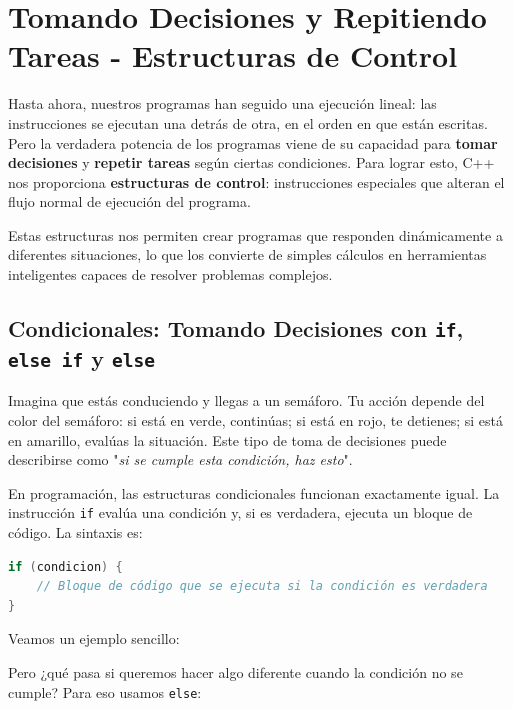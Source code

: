 \section{Tomando Decisiones y Repitiendo Tareas - Estructuras de Control}\label{sec:estructuras_control}

Hasta ahora, nuestros programas han seguido una ejecución lineal: las instrucciones se ejecutan una detrás de otra, en el orden en que están escritas. Pero la verdadera potencia de los programas viene de su capacidad para \textbf{tomar decisiones} y \textbf{repetir tareas} según ciertas condiciones. Para lograr esto, C++ nos proporciona \textbf{estructuras de control}: instrucciones especiales que alteran el flujo normal de ejecución del programa.

Estas estructuras nos permiten crear programas que responden dinámicamente a diferentes situaciones, lo que los convierte de simples cálculos en herramientas inteligentes capaces de resolver problemas complejos.

\subsection{Condicionales: Tomando Decisiones con \texttt{if}, \texttt{else if} y \texttt{else}}\label{subsec:condicionales}

Imagina que estás conduciendo y llegas a un semáforo. Tu acción depende del color del semáforo: si está en verde, continúas; si está en rojo, te detienes; si está en amarillo, evalúas la situación. Este tipo de toma de decisiones puede describirse como "\textit{si se cumple esta condición, haz esto}".

En programación, las estructuras condicionales funcionan exactamente igual. La instrucción \texttt{if} evalúa una condición y, si es verdadera, ejecuta un bloque de código. La sintaxis es:

\begin{lstlisting}[language=C++]
if (condicion) {
    // Bloque de código que se ejecuta si la condición es verdadera
}
\end{lstlisting}

Veamos un ejemplo sencillo:



Pero ¿qué pasa si queremos hacer algo diferente cuando la condición no se cumple? Para eso usamos \texttt{else}:


